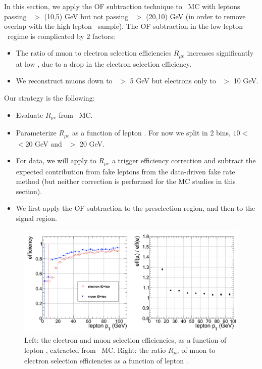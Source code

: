 In this section, we apply the OF subtraction technique to \ttbar\ MC with
leptons passing \pt\ $>$ (10,5) GeV but not passing \pt\ $>$ (20,10) GeV
(in order to remove overlap with the high lepton \pt\ sample).
The OF subtraction in the low lepton \pt\ regime is complicated by 2 factors:

\begin{itemize}
\item The ratio of muon to electron selection efficiencies $R_{\mu e}$ increases significantly 
at low \pt, due to a drop in the electron selection efficiency.
\item We reconstruct muons down to \pt\ $>$ 5 GeV but electrons only to \pt\ $>$ 10 GeV.
\end{itemize}

Our strategy is the following:

\begin{itemize}
\item Evaluate $R_{\mu e}$ from \ttbar\ MC. 
\item Parameterize $R_{\mu e}$ as a function of lepton \pt. For now we split in 2 bins, $10 < $ \pt\ $ < 20$ GeV
and \pt\ $>$ 20 GeV.
\item For data, we will apply to $R_{\mu e}$ a trigger efficiency correction and subtract the 
expected contribution from fake leptons from the data-driven fake rate method (but neither correction is performed for the
MC studies in this section).
\item We first apply the OF subtraction to the preselection region, and then to the signal region. 
\end{itemize}

\begin{figure}[tbh]
\begin{center}
\includegraphics[width=1\linewidth]{plots/r_ttmadgraph.png}
\caption{\label{fig:rtt}\protect 
Left: the electron and muon selection efficiencies, as a function of lepton \pt, extracted
from \ttbar\ MC. Right: the ratio $R_{\mu e}$ of muon to electron selection efficiencies
as a function of lepton \pt.
}
\end{center}
\end{figure}


